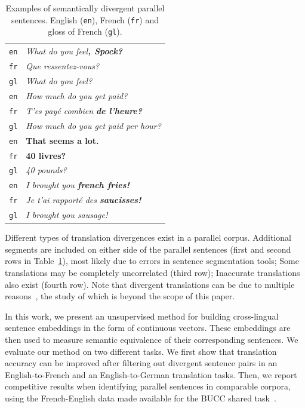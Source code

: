 \documentclass[11pt,a4paper]{article}
\begin{document}
\begin{table}[ht]
\small
\center
\begin{tabular}{ c|l }
  \hline  
  \texttt{en} & \it{What do you feel}\bf{, Spock}\it{?} \\
  \texttt{fr} & \it{Que ressentez-vous?} \\
  \texttt{gl} & {\small \it{What do you feel?}} \\
  \hline
  \texttt{en} & \it{How much do you get paid?} \\
  \texttt{fr} & \it{T'es pay\'e combien} \bf{de l'heure}\it{?} \\
  \texttt{gl} & {\small \it{How much do you get paid per hour?}} \\
  \hline  
  \texttt{en} &  \bf{That seems a lot.} \\
  \texttt{fr} & \bf{40 livres?} \\
  \texttt{gl} & {\small \it{40 pounds?}} \\
  \hline  
  \texttt{en} & \it{I brought you} \bf{french fries}\it{!} \\
  \texttt{fr} & \it{Je t'ai rapport\'e des} \bf{saucisses}\it{!} \\
  \texttt{gl} & {\small \it{I brought you sausage!}} \\
  \hline
\end{tabular}
\caption[Table caption text]{Examples of semantically divergent parallel sentences. English (\texttt{en}), French (\texttt{fr}) and gloss of French (\texttt{gl}).}
\label{tab:examples}
\end{table}

Different types of translation divergences exist in a parallel corpus.
Additional segments are included on either side of the parallel
sentences (first and second rows in Table~\ref{tab:examples}), most likely due to errors in sentence segmentation tools;
Some translations may be completely uncorrelated (third row);
Inaccurate translations also exist (fourth row). 
Note that divergent translations can be due to multiple reasons~\cite{C14-1055}, the study of which is beyond the scope of this paper. 

In this work, we present an unsupervised method for building cross-lingual sentence embeddings in the form of continuous vectors. 
These embeddings are then used to measure semantic equivalence of their corresponding sentences.
We evaluate our method on two different tasks. We first show that translation accuracy can be improved after filtering out divergent sentence pairs in an English-to-French and an English-to-German translation tasks.
Then, we report competitive results when identifying parallel sentences in comparable corpora, using the French-English data made available for the BUCC shared task~\cite{ZWEIGENBAUM18.12}.
\end{document}

